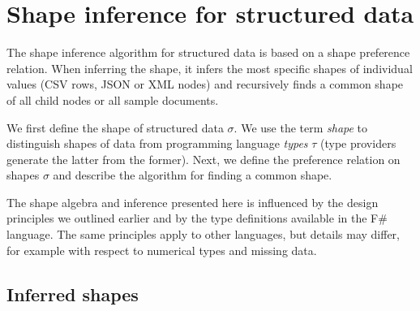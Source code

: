 \documentclass[10pt]{sigplanconf}
\begin{document}
%
%

\section{Shape inference for structured data}
\label{sec:inference}

The shape inference algorithm for structured data is based on a shape preference relation. When
inferring the shape, it infers the most specific shapes of individual values (CSV rows, JSON or XML
nodes) and recursively finds a common shape of all child nodes or all sample documents.

We first define the shape of structured data $\sigma$. We use the term \emph{shape} to distinguish
shapes of data from programming language \emph{types} $\tau$ (type providers generate the latter from the former).
Next, we define the preference relation on shapes $\sigma$ and describe the algorithm
for finding a common shape.

The shape algebra and inference presented here is influenced by the design principles
we outlined earlier and by the type definitions available in the F\# language.
The same principles apply to other languages, but details may differ, for example
with respect to numerical types and missing data.


\subsection{Inferred shapes}
\label{sec:inference-types}
\end{document}
